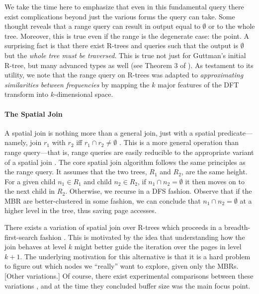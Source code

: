 We take the time here to emphasize that even in this fundamental query there exist complications beyond just the various forms the query can take.
Some thought reveals that a range query can result in output equal to $\emptyset$ or to the whole tree.
Moreover, this is true even if the range is the degenerate case: the point.
A surprising fact is that there exist R-trees and queries such that the output is $\emptyset$ but the \emph{whole tree must be traversed}.
This is true not just for Guttman's initial R-tree, but many advanced types as well (see Theorem 3 of \cite{argeberghaverkortyi04}).
As testament to its utility, we note that the range query on R-trees was adapted to \emph{approximating similarities between frequencies} \cite{agrawalfaloutsosswami93} by mapping the $k$ major features of the DFT transform into $k$-dimensional space.

\paragraph{The Spatial Join}
A spatial join is nothing more than a general join, just with a spatial predicate---namely, join $r_1$ with $r_2$ iff $r_1\cap r_2\neq\emptyset$ \cite{brinkhoffkriegelseeger93}.
This is a more general operation than range query---that is, range queries are easily reducible to the appropriate variant of a spatial join \cite{gaedegunther98}.
The core spatial join algorithm \cite{brinkhoffkriegelseeger93} follows the same principles as the range query.
It assumes that the two trees, $R_1$ and $R_2$, are the same height.
For a given child $n_1\in R_1$ and child $n_2\in R_2$, if $n_1\cap n_2=\emptyset$ it then moves on to the next child in $R_2$.
Otherwise, we recurse in a DFS fashion.
Observe that if the MBR are better-clustered in some fashion, we can conclude that $n_1\cap n_2=\emptyset$ at a higher level in the tree, thus saving page accesses.

There exists a variation of spatial join over R-trees which proceeds in a breadth-first-search fashion \cite{huangjingrundensteiner97}.
This is motivated by the idea that understanding how the join behaves at level $k$ might better guide the iteration over the pages in level $k+1$.
The underlying motivation for this alternative is that it is a hard problem to figure out which nodes we ``really'' want to explore, given only the MBRs.
[Other variations.]
Of course, there exist experimental comparisons between these variations \cite{papadopoulosrigauxscholl99}, and at the time they concluded buffer size was the main focus point.

